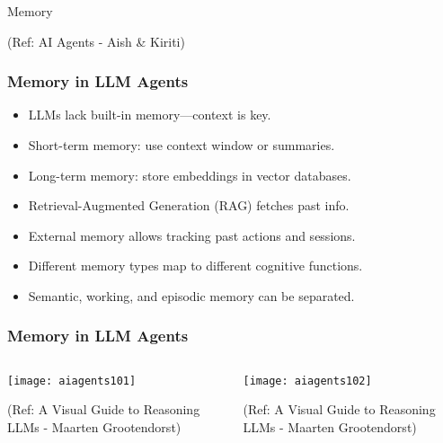 \begin{frame}[fragile]\frametitle{}
\begin{center}
{\Large Memory}

{\tiny (Ref: AI Agents - Aish \& Kiriti)}
\end{center}
\end{frame}

\begin{frame}[fragile]\frametitle{Memory in LLM Agents}

      \begin{itemize}
        \item LLMs lack built-in memory—context is key.
        \item Short-term memory: use context window or summaries.
        \item Long-term memory: store embeddings in vector databases.
        \item Retrieval-Augmented Generation (RAG) fetches past info.
        \item External memory allows tracking past actions and sessions.
        \item Different memory types map to different cognitive functions.
        \item Semantic, working, and episodic memory can be separated.
      \end{itemize}

\end{frame}


\begin{frame}[fragile]\frametitle{Memory in LLM Agents}


\begin{columns}
    \begin{column}[T]{0.6\linewidth}
        \begin{center}
        \texttt{[image: aiagents101]}

		
        {\tiny (Ref: A Visual Guide to Reasoning LLMs - Maarten Grootendorst)}
        \end{center}

    \end{column}
    \begin{column}[T]{0.4\linewidth}
        \begin{center}
        \texttt{[image: aiagents102]}

		
        {\tiny (Ref: A Visual Guide to Reasoning LLMs - Maarten Grootendorst)}
        \end{center}
    \end{column}
  \end{columns}

\end{frame}


